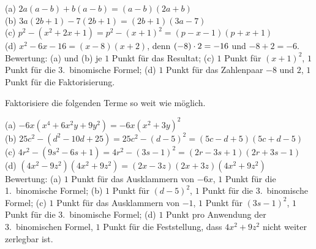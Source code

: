 \documentclass[11pt]{exam}
\begin{document}
\begin{questions}
{\begin{solution}
	(a) $2a(a-b)+b(a-b)=(a-b)(2a+b)$\\
	(b) $3a(2b+1)-7(2b+1)=(2b+1)(3a-7)$\\
	(c) $p^2-(x^2+2x+1)=p^2-(x+1)^2=(p-x-1)(p+x+1)$\\
	(d) $x^2-6x-16=(x-8)(x+2)$, denn $(-8)\cdot2=-16$ und $-8+2=-6$.\\
	Bewertung: (a) und (b) je $1$ Punkt für das Resultat; (c) $1$ Punkt für $(x+1)^2$, $1$ Punkt für die 3.\ binomische Formel; (d) $1$ Punkt für das Zahlenpaar $-8$ und $2$, $1$ Punkt für die Faktorisierung.
\end{solution}}
{}

\noaddpoints
\question[\totalpoints]
\addpoints
Faktorisiere die folgenden Terme so weit wie möglich.
{\begin{solution}
	(a) $-6x(x^4+6x^2y+9y^2)=-6x(x^2+3y)^2$\\
	(b) $25c^2-(d^2-10d+25)=25c^2-(d-5)^2=(5c-d+5)(5c+d-5)$\\
	(c) $4r^2-(9s^2-6s+1)=4r^2-(3s-1)^2=(2r-3s+1)(2r+3s-1)$\\
	(d) $(4x^2-9z^2)(4x^2+9z^2)=(2x-3z)(2x+3z)(4x^2+9z^2)$\\
	Bewertung: (a) $1$ Punkt für das Ausklammern von $-6x$, $1$ Punkt für die 1.\ binomische Formel; (b) $1$ Punkt für $(d-5)^2$, $1$ Punkt für die 3.\ binomische Formel; (c) $1$ Punkt für das Ausklammern von $-1$, $1$ Punkt für $(3s-1)^2$, $1$ Punkt für die 3.\ binomische Formel; (d) $1$ Punkt pro Anwendung der 3.\ binomischen Formel, $1$ Punkt für die Feststellung, dass $4x^2+9z^2$ nicht weiter zerlegbar ist.
\end{solution}}
{}


\end{questions}
\end{document}
